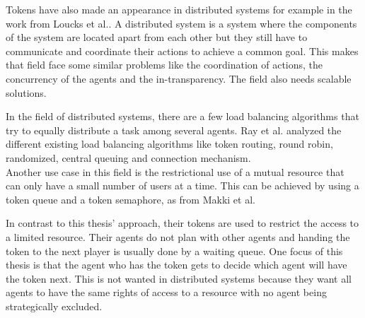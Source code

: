 
Tokens have also made an appearance in distributed systems for example in the work from Loucks et al.\cite{loucks1997system}. A distributed system is a system where the components of the system are located apart from each other but they still have to communicate and coordinate their actions to achieve a common goal. This makes that field face some similar problems like the coordination of actions, the concurrency of the agents and the in-transparency. The field also needs scalable solutions.

In the field of distributed systems, there are a few load balancing algorithms that try to equally distribute a task among several agents. Ray et al.\cite{ray2012execution} analyzed the different existing load balancing algorithms like token routing, round robin, randomized, central queuing and connection mechanism. \\
Another use case in this field is the restrictional use of a mutual resource that can only have a small number of users at a time. This can be achieved by using a token queue and a token semaphore, as from Makki et al.\cite{makki1992token}

In contrast to this thesis' approach, their tokens are used to restrict the access to a limited resource. Their agents do not plan with other agents and handing the token to the next player is usually done by a waiting queue. One focus of this thesis is that the agent who has the token gets to decide which agent will have the token next. This is not wanted in distributed systems because they want all agents to have the same rights of access to a resource with no agent being strategically excluded.

